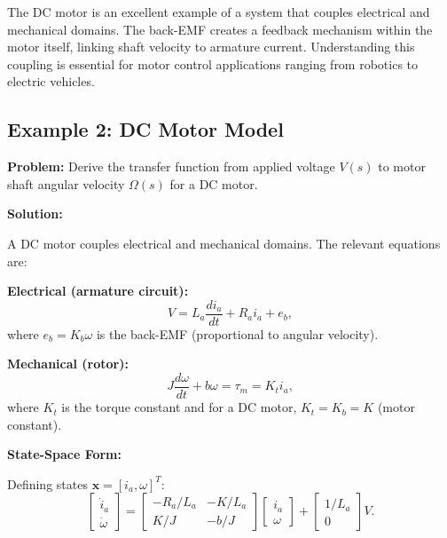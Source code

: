 \hrulefill

\begin{examplebox}
The DC motor is an excellent example of a system that couples electrical and mechanical domains. The back-EMF creates a feedback mechanism within the motor itself, linking shaft velocity to armature current. Understanding this coupling is essential for motor control applications ranging from robotics to electric vehicles.
\end{examplebox}

\subsection{Example 2: DC Motor Model}

\textbf{Problem:} Derive the transfer function from applied voltage $V(s)$ to motor shaft angular velocity $\Omega(s)$ for a DC motor.

\textbf{Solution:}

A DC motor couples electrical and mechanical domains. The relevant equations are:

\textbf{Electrical (armature circuit):}
\begin{equation}
V = L_a\frac{di_a}{dt} + R_a i_a + e_b,
\end{equation}
where $e_b = K_b\omega$ is the back-EMF (proportional to angular velocity).

\textbf{Mechanical (rotor):}
\begin{equation}
J\frac{d\omega}{dt} + b\omega = \tau_m = K_t i_a,
\end{equation}
where $K_t$ is the torque constant and for a DC motor, $K_t = K_b = K$ (motor constant).

\textbf{State-Space Form:}

Defining states $\mathbf{x} = [i_a, \omega]^T$:
\begin{equation}
\begin{bmatrix} \dot{i}_a \\ \dot{\omega} \end{bmatrix} =
\begin{bmatrix} -R_a/L_a & -K/L_a \\ K/J & -b/J \end{bmatrix}
\begin{bmatrix} i_a \\ \omega \end{bmatrix} +
\begin{bmatrix} 1/L_a \\ 0 \end{bmatrix} V.
\end{equation}

